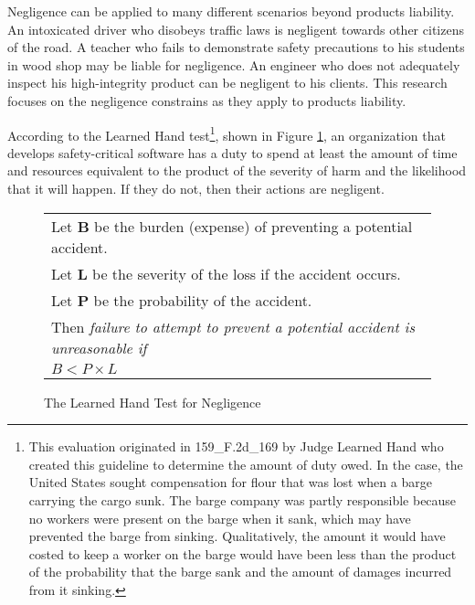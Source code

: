 Negligence can be applied to many different scenarios beyond products
liability. An intoxicated driver who disobeys traffic laws is negligent towards
other citizens of the road. A teacher who fails to demonstrate safety
precautions to his students in wood shop may be liable for negligence. An
engineer who does not adequately inspect his high-integrity product can be
negligent to his clients. This research focuses on the negligence constrains as
they apply to products liability.

According to the Learned Hand test\footnote{This evaluation originated in
\cite{cases}{159_F.2d_169} by Judge Learned Hand who created this guideline to
determine the amount of duty owed. In the case, the United States sought
compensation for flour that was lost when a barge carrying the cargo sunk. The
barge company was partly responsible because no workers were present on the
barge when it sank, which may have prevented the barge from sinking.
Qualitatively, the amount it would have costed to keep a worker on the barge
would have been less than the product of the probability that the barge sank and
the amount of damages incurred from it sinking.}, shown in Figure
\ref{fig:handtest}, an organization that develops safety-critical software has a
duty to spend at least the amount of time and resources equivalent to the
product of the severity of harm and the likelihood that it will happen. If they
do not, then their actions are negligent.

\begin{figure}
\begin{narrow}{-1.5in}{-1.5in}\begin{center}
\begin{tabular}{|l|}
\hline
	Let \textbf{B} be the burden (expense) of preventing a potential accident.\\
	Let \textbf{L} be the severity of the loss if the accident occurs.\\
	Let \textbf{P} be the probability of the accident.\\[6pt]
	Then \textit{failure to attempt to prevent a potential accident is 
	unreasonable if}\\[8pt]

      \centerline{\(B < P \times L\)}
\\[3pt]
\hline
\end{tabular}
\end{center}\end{narrow}
\caption{The Learned Hand Test for Negligence}
\label{fig:handtest}
\end{figure}

